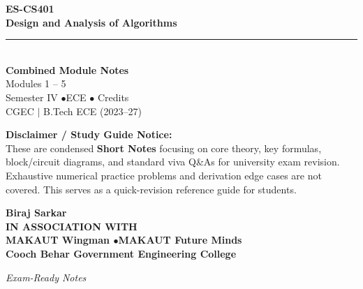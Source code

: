 \documentclass[12pt,a4paper]{article}
\begin{document}
\thispagestyle{empty}


\vspace*{1.0cm}
\begin{center}
  {\Huge\bfseries\color{myred} ES-CS401}\\[10pt]
  {\LARGE\bfseries\color{mydark} Design and Analysis of Algorithms}\\[20pt]
  {\color{myred}\rule{0.7\linewidth}{1.5pt}}\\[18pt]
  {\Large\color{myteal}\textbf{Combined Module Notes}}\\[8pt]
  {\large\color{mydark} Modules 1 -- 5}\\[40pt]
  {\normalsize\color{mydark} Semester IV \quad$\bullet$\quad ECE \quad$\bullet$ Credits}\\[12pt]
  {\normalsize\color{mydark} CGEC \;$|$\; B.Tech ECE (2023--27)}
\end{center}
\vspace{1.0cm}
\begin{center}
  \begin{tcolorbox}[colback=mygray, colframe=mgframe, boxrule=0.5pt, arc=3pt, width=0.85\linewidth]
    \centering\small\color{mydark}
    \textbf{Disclaimer / Study Guide Notice:}\\
    These are condensed \textbf{Short Notes} focusing on core theory, key formulas, block/circuit diagrams, and standard viva Q\&As for university exam revision. Exhaustive numerical practice problems and derivation edge cases are not covered. This serves as a quick-revision reference guide for students.
  \end{tcolorbox}
\end{center}
\vfill
\vspace{0.6cm}
\begin{center}
  {\large\bfseries\color{mypurple} Biraj Sarkar}\\[16pt]
  {\footnotesize\color{watermark}\textbf{IN ASSOCIATION WITH}}\\[8pt]
  {\small\bfseries\color{mydark} MAKAUT Wingman \quad$\bullet$\quad MAKAUT Future Minds}\\[12pt]
  {\large\bfseries\color{myteal} Cooch Behar Government Engineering College}
\end{center}
\vfill
\begin{center}{\small\color{watermark}\textit{Exam-Ready Notes}}\end{center}
\clearpage
\end{document}
